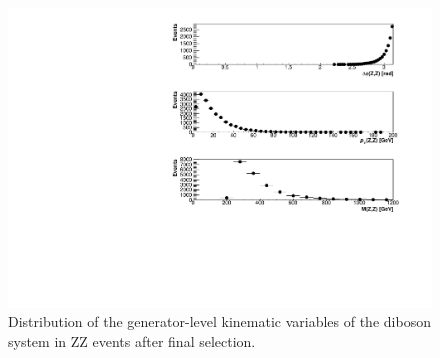 \begin{figure}[htbp]
\begin{center}
\includegraphics[width=\textwidth]{figures/genvars.pdf}
\caption{Distribution of the generator-level kinematic variables of the diboson system in ZZ events after final selection.
}
\label{fig:genvars_qcd_zz}
\end{center}
\end{figure}

